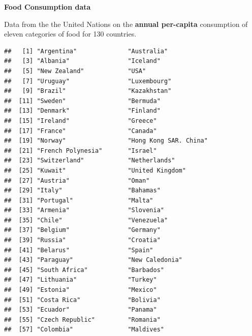 \documentclass[ignorenonframetext,]{beamer}
\newenvironment{Shaded}{\begin{snugshade}}{\end{snugshade}}
\newcommand{\KeywordTok}[1]{\textcolor[rgb]{0.13,0.29,0.53}{\textbf{#1}}}
\newcommand{\NormalTok}[1]{#1}
\newcommand{\OperatorTok}[1]{\textcolor[rgb]{0.81,0.36,0.00}{\textbf{#1}}}
\begin{document}
\begin{frame}[fragile]{}
\protect\hypertarget{section-5}{}

\textbf{\large Food Consumption data}

Data from the the United Nations on the \textbf{annual per-capita}
consumption of eleven categories of food for 130 countries.

\vspace{1ex}\scriptsize

\begin{Shaded}
\end{Shaded}

\begin{verbatim}
##   [1] "Argentina"              "Australia"             
##   [3] "Albania"                "Iceland"               
##   [5] "New Zealand"            "USA"                   
##   [7] "Uruguay"                "Luxembourg"            
##   [9] "Brazil"                 "Kazakhstan"            
##  [11] "Sweden"                 "Bermuda"               
##  [13] "Denmark"                "Finland"               
##  [15] "Ireland"                "Greece"                
##  [17] "France"                 "Canada"                
##  [19] "Norway"                 "Hong Kong SAR. China"  
##  [21] "French Polynesia"       "Israel"                
##  [23] "Switzerland"            "Netherlands"           
##  [25] "Kuwait"                 "United Kingdom"        
##  [27] "Austria"                "Oman"                  
##  [29] "Italy"                  "Bahamas"               
##  [31] "Portugal"               "Malta"                 
##  [33] "Armenia"                "Slovenia"              
##  [35] "Chile"                  "Venezuela"             
##  [37] "Belgium"                "Germany"               
##  [39] "Russia"                 "Croatia"               
##  [41] "Belarus"                "Spain"                 
##  [43] "Paraguay"               "New Caledonia"         
##  [45] "South Africa"           "Barbados"              
##  [47] "Lithuania"              "Turkey"                
##  [49] "Estonia"                "Mexico"                
##  [51] "Costa Rica"             "Bolivia"               
##  [53] "Ecuador"                "Panama"                
##  [55] "Czech Republic"         "Romania"               
##  [57] "Colombia"               "Maldives"              

\end{verbatim}
\end{frame}
\end{document}
